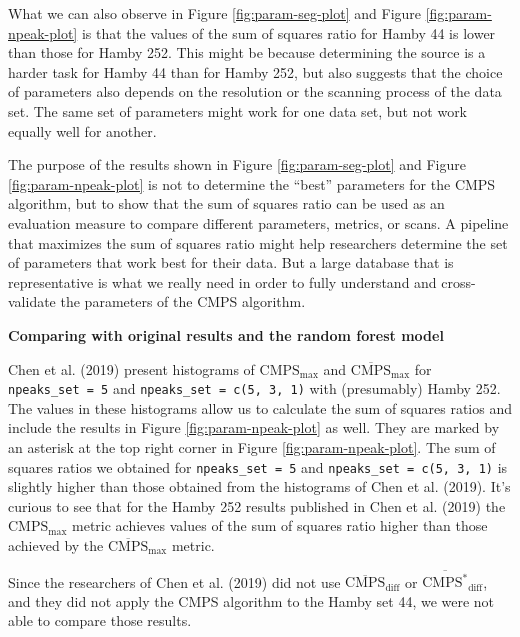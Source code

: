 What we can also observe in Figure \ref{fig:param-seg-plot} and Figure \ref{fig:param-npeak-plot} is that the values of the sum of squares ratio for Hamby 44 is lower than those for Hamby 252.
This might be because determining the source is a harder task for Hamby 44 than for Hamby 252, but also suggests that the choice of parameters also depends on the resolution or the scanning process of the data set.
The same set of parameters might work for one data set, but not work equally well for another.

The purpose of the results shown in Figure \ref{fig:param-seg-plot} and Figure \ref{fig:param-npeak-plot} is not to determine the ``best'' parameters for the CMPS algorithm, but to show that the sum of squares ratio can be used as an evaluation measure to compare different parameters, metrics, or scans.
A pipeline that maximizes the sum of squares ratio might help researchers determine the set of parameters that work best for their data.
But a large database that is representative is what we really need in order to fully understand and cross-validate the parameters of the CMPS algorithm.

\textbf{Comparing with original results and the random forest model}

Chen et al. (2019) present histograms of \(\mathrm{CMPS_{max}}\) and \(\mathrm{\overline{CMPS}_{max}}\) for \texttt{npeaks\_set\ =\ 5} and \texttt{npeaks\_set\ =\ c(5,\ 3,\ 1)} with (presumably) Hamby 252.
The values in these histograms allow us to calculate the sum of squares ratios and include the results in Figure \ref{fig:param-npeak-plot} as well.
They are marked by an asterisk at the top right corner in Figure \ref{fig:param-npeak-plot}.
The sum of squares ratios we obtained for \texttt{npeaks\_set\ =\ 5} and \texttt{npeaks\_set\ =\ c(5,\ 3,\ 1)} is slightly higher than those obtained from the histograms of Chen et al. (2019).
It's curious to see that for the Hamby 252 results published in Chen et al. (2019) the \(\mathrm{{CMPS}_{max}}\) metric achieves values of the sum of squares ratio higher than those achieved by the \(\mathrm{\overline{CMPS}_{max}}\) metric.

Since the researchers of Chen et al. (2019) did not use \(\mathrm{\overline{CMPS}_{diff}}\) or \(\mathrm{\overline{CMPS^*}_{diff}}\), and they did not apply the CMPS algorithm to the Hamby set 44, we were not able to compare those results.

